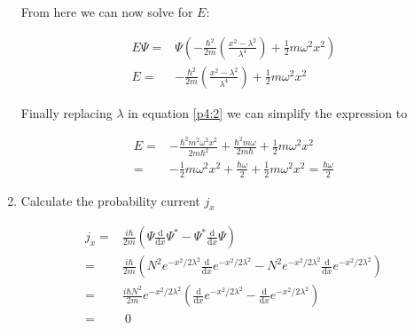 \documentclass[11pt,letterpaper]{article}%
\newcommand{\dx}{\mathrm{d}x}
\begin{document}
\begin{enumerate}
{From here we can now solve for $E$:

\begin{equation}
\label{p4:2}
\begin{split}
E\Psi =& \Psi\left( -\frac{\hbar^2}{2m}\left( \frac{x^2 - \lambda^2}{\lambda^4} \right) + \frac{1}{2}m\omega^2x^2 \right)\\
E =& \boxed{-\frac{\hbar^2}{2m}\left( \frac{x^2 - \lambda^2}{\lambda^4} \right) + \frac{1}{2}m\omega^2x^2}
\end{split}
\end{equation}

Finally replacing $\lambda$ in equation \eqref{p4:2} we can simplify the expression to

\begin{equation}
\label{p4:3}
\begin{split}
E =& -\frac{\hbar^2m^2\omega^2x^2}{2m\hbar^2} + \frac{\hbar^2m\omega}{2m\hbar} + \frac{1}{2}m\omega^2x^2\\
=& -\frac{1}{2}m\omega^2x^2 + \frac{\hbar\omega}{2} + \frac{1}{2}m\omega^2x^2 = \boxed{\frac{\hbar\omega}{2}}
\end{split}
\end{equation}
}

\item
{
Calculate the probability current $j_x$

\begin{equation}
\label{p5:1}
\begin{split}
j_x =& \frac{i\hbar}{2m}\left(\Psi \frac{\mathrm{d}}{\dx}\Psi^* - \Psi^*\frac{\mathrm{d}}{\dx}\Psi \right)\\
=& \frac{i\hbar}{2m}\left(N^2e^{-x^2/2\lambda^2}\frac{\mathrm{d}}{\dx}e^{-x^2/2\lambda^2} - N^2e^{-x^2/2\lambda^2}\frac{\mathrm{d}}{\dx}e^{-x^2/2\lambda^2}\right)\\
=& \frac{i\hbar N^2}{2m}e^{-x^2/2\lambda^2}\left( \frac{\mathrm{d}}{\dx}e^{-x^2/2\lambda^2} - \frac{\mathrm{d}}{\dx}e^{-x^2/2\lambda^2} \right)\\
=&\ \boxed{0}
\end{split}
\end{equation}
}

\end{enumerate}
\end{document}
